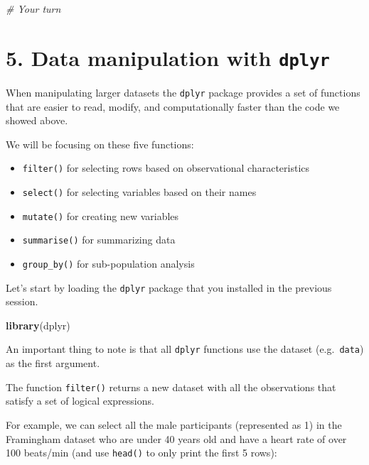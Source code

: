 \documentclass[
]{article}
\newenvironment{Shaded}{\begin{snugshade}}{\end{snugshade}}
\newcommand{\CommentTok}[1]{\textcolor[rgb]{0.56,0.35,0.01}{\textit{#1}}}
\newcommand{\KeywordTok}[1]{\textcolor[rgb]{0.13,0.29,0.53}{\textbf{#1}}}
\newcommand{\NormalTok}[1]{#1}
\providecommand{\tightlist}{%
  \setlength{\itemsep}{0pt}\setlength{\parskip}{0pt}}
\begin{document}
\begin{Shaded}
\begin{Highlighting}[]
\CommentTok{# Your turn}
\end{Highlighting}
\end{Shaded}

\hypertarget{data-manipulation-with-dplyr}{%
\section{\texorpdfstring{5. Data manipulation with
\texttt{dplyr}}{5. Data manipulation with dplyr}}\label{data-manipulation-with-dplyr}}

When manipulating larger datasets the \texttt{dplyr} package provides a
set of functions that are easier to read, modify, and computationally
faster than the code we showed above.

We will be focusing on these five functions:

\begin{itemize}
\tightlist
\item
  \texttt{filter()} for selecting rows based on observational
  characteristics
\item
  \texttt{select()} for selecting variables based on their names
\item
  \texttt{mutate()} for creating new variables
\item
  \texttt{summarise()} for summarizing data
\item
  \texttt{group\_by()} for sub-population analysis
\end{itemize}

Let's start by loading the \texttt{dplyr} package that you installed in
the previous session.

\begin{Shaded}
\begin{Highlighting}[]
\KeywordTok{library}\NormalTok{(dplyr)}
\end{Highlighting}
\end{Shaded}

An important thing to note is that all \texttt{dplyr} functions use the
dataset (e.g.~\texttt{data}) as the first argument.

The function \texttt{filter()} returns a new dataset with all the
observations that satisfy a set of logical expressions.

For example, we can select all the male participants (represented as 1)
in the Framingham dataset who are under 40 years old and have a heart
rate of over 100 beats/min (and use \texttt{head()} to only print the
first 5 rows):
\end{document}
